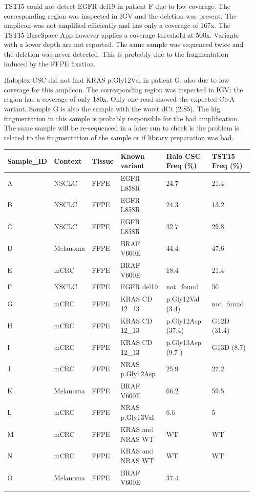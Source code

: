 TST15 could not detect EGFR del19 in patient F due to low coverage. The
corresponding region was inspected in IGV and the deletion was present.  The
amplicon was not amplified  efficiently and has only a coverage of 167x. The
TST15 BaseSpace App however  applies a coverage threshold at 500x. Variants with
a lower depth are not reported. The same sample was sequenced twice and the
deletion was never detected. This is probably due to the fragmentation induced
by the FFPE fixation.

Haloplex CSC did not find KRAS p.Gly12Val in patient G, also due to low coverage
for this amplicon. The corresponding region was inspected in IGV: the region has
a coverage of only 180x. Only one read showed the expected C>A variant.  Sample
G is also the sample with the worst dCt (2.85). The  hig fragmentation in this
sample is probably responsible for the bad amplification. The same sample will
be re-sequenced in a later run to check  is the problem is related to the
fragmentation of the sample or if library preparation was bad.

\begin{table}
\begin{tabular}{p{3.5cm} p{1cm} p{1cm}}\\
\hline
Sample_ID & Context & Tissue & Known variant & Halo CSC Freq (\%) & TST15 Freq (\%) \\
\hline
A & NSCLC & FFPE & EGFR L858R & 24.7 & 21.4 \\
B & NSCLC & FFPE & EGFR L858R & 24.3 & 13.2 \\
C & NSCLC & FFPE & EGFR L858R & 32.7 & 29.8\\
D & Melanoma & FFPE & BRAF V600E & 44.4 & 47.6 \\
E & mCRC & FFPE & BRAF V600E & 18.4 & 21.4 \\
F & NSCLC & FFPE & EGFR del19 & not_found & 50 \\
G & mCRC & FFPE & KRAS CD 12_13 & p.Gly12Val (3.4) & not_found \\
H & mCRC & FFPE & KRAS CD 12_13  & p.Gly12Asp (37.4) & G12D (31.4)\\
I & mCRC & FFPE & KRAS CD 12_13  & p.Gly13Asp (9.7 )& G13D (8.7) \\
J & mCRC & FFPE & NRAS p.Gly12Asp & 25.9 & 27.2 \\
K & Melanoma & FFPE & BRAF V600E & 66.2 & 59.5 \\
L & mCRC & FFPE & NRAS p.Gly13Val & 6.6 & 5 \\
M & mCRC & FFPE & KRAS and NRAS WT & WT & WT \\
N & mCRC & FFPE & KRAS and NRAS WT & WT & WT \\
O & Melanoma & FFPE &BRAF V600E & 37.4 & \\
\label{known_variants}
\end{tabular}
\end{table}

